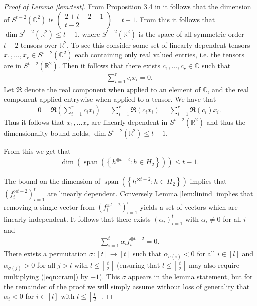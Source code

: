 \documentclass[aos,preprint]{imsart}
\def\rn{\mathbb{R}}
\def\cn{\mathbb{C}}
\def\l{\left}
\def\r{\right}
\def\spn{\operatorname{span}}
\theoremstyle{plain}
\theoremstyle{defintion}
\begin{document}
\begin{proof}[Proof of Lemma \ref{lem:test}]
	From Proposition 3.4 in \cite{symtensorrank} it follows that the dimension of $S^{ t-2 }\left( \cn^2 \right)$ is $\left( \begin{array}{c} 2+ t-2-1 \\ t-2 \end{array} \right) = t-1$. From this it follows that $\dim S^{t-2}\left( \rn^2 \right) \le t-1$, where $S^{t-2}\left( \rn^2 \right)$ is the space of all symmetric order $t-2$ tensors over $\rn^2$. To see this consider some set of linearly dependent tensors $x_1,\ldots,x_r  \in S^{t-2}\left( \mathbb{C}^2 \right)$ each containing only real valued entries, i.e. the tensors are in $S^{t-2}\l(\rn^2\r)$. Then it follows that there exists $c_1,\ldots, c_r \in \mathbb{C}$ such that
		\begin{eqnarray*}
			\sum_{i=1}^r c_i x_i = 0.
		\end{eqnarray*}
		Let $\Re$ denote the real component when applied to an element of $\mathbb{C}$, and the real component applied entrywise when applied to a tensor. We have that
		\begin{align*}
			0 =\Re\left(\sum_{i=1}^r  c_i  x_i\right) = \sum_{i=1}^r \Re \left(c_i  x_i\right) = \sum_{i=1}^r \Re \left(c_i  \right) x_i.
		\end{align*}
		Thus it follows that $x_1,\ldots x_r$ are linearly dependent in $S^{t-2}\l(\rn^2\r)$ and thus the dimensionality bound holds, $\dim S^{t-2}\left( \rn^2 \right) \le t-1$.


		From this we get that 
		\begin{align*}
			\dim\left( \spn\left( \left\{ h^{\otimes t-2}: h \in H_2 \right\} \right)\right)\le t-1.
		\end{align*}

		The bound on the dimension of $\spn\left( \left\{ h^{\otimes t-2}: h \in H_2 \right\} \right)$ implies that $\left( f_i^{\otimes t-2} \right)_{i=1}^{t}$ are linearly dependent. Conversely Lemma \ref{lem:linind} implies that removing a single vector from $\left( f_i^{\otimes t-2} \right)_{i=1}^{t}$ yields a set of vectors which are linearly independent. It follows that there exists $\left( \alpha_i \right)_{i=1}^{t}$ with $\alpha_i \neq 0$ for all $i$ and
		\begin{eqnarray} \label{eqn:cram}
			\sum_{i=1}^{t}\alpha_i f_i^{\otimes t-2} = 0.
		\end{eqnarray}
		There exists a permutation $\sigma:[t] \to [t]$ such that $\alpha_{\sigma\left( i \right)}< 0$ for all $i \in \left[ l \right]$ and $\alpha_{\sigma\left( j \right)} >0$ for all $j>l$ with $l\le \l\lfloor \frac{t}{2}\r\rfloor$ (ensuring that $l\le \l\lfloor \frac{t}{2}\r\rfloor$ may also require multiplying (\ref{eqn:cram}) by $-1$). This $\sigma$ appears in the lemma statement, but for the remainder of the proof we will simply assume without loss of generality that $\alpha_i<0$ for $i\in \left[ l \right]$ with $l\le \l\lfloor \frac{t}{2}\r\rfloor$.


\end{proof}
\end{document}
